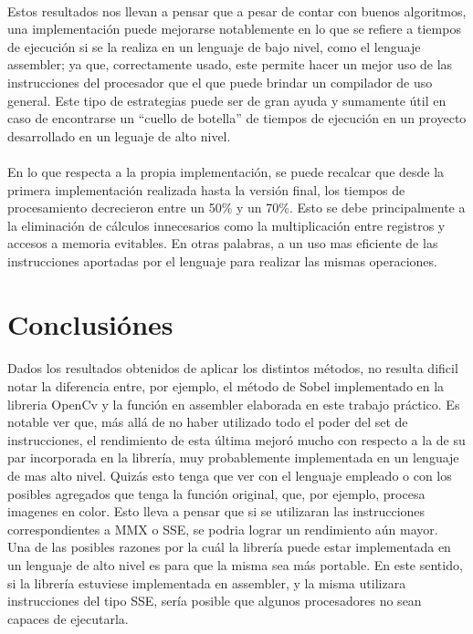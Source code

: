 \documentclass[11pt, a4paper]{article}
\begin{document}
\paragraph{}
Estos resultados nos llevan a pensar que a pesar de contar con buenos algoritmos, una implementaci\'on puede mejorarse notablemente en lo que se refiere a tiempos de ejecuci\'on si se la realiza en un lenguaje de bajo nivel, como el lenguaje assembler; ya que, correctamente usado, este permite hacer un mejor uso de las instrucciones del procesador que el que puede brindar un compilador de uso general. Este tipo de estrategias puede ser de gran ayuda y sumamente \'util en caso de encontrarse un ``cuello de botella'' de tiempos de ejecuci\'on en un proyecto desarrollado en un leguaje de alto nivel.

\paragraph{}
En lo que respecta a la propia implementaci\'on, se puede recalcar que desde la primera implementaci\'on realizada hasta la versi\'on final, los tiempos de procesamiento decrecieron entre un 50\% y un 70\%. Esto se debe principalmente a la eliminaci\'on de c\'alculos innecesarios como la multiplicaci\'on entre registros y accesos a memoria evitables. En otras palabras, a un uso mas eficiente de las instrucciones aportadas por el lenguaje para realizar las mismas operaciones.


\newpage

\section{Conclusi\'ones}

\paragraph{}

Dados los resultados obtenidos de aplicar los distintos m\'etodos, no resulta dificil notar la diferencia entre, por ejemplo, el m\'etodo de Sobel implementado en la libreria OpenCv y la funci\'on en assembler elaborada en este trabajo pr\'actico. Es notable ver que, m\'as all\'a de no haber utilizado todo el poder del set de instrucciones, el rendimiento de esta \'ultima mejor\'o mucho con respecto a la de su par incorporada en la librer\'ia, muy probablemente implementada en un lenguaje de mas alto nivel.
Quiz\'as esto tenga que ver con el lenguaje empleado o con los posibles agregados que tenga la funci\'on original, que, por ejemplo, procesa imagenes en color. Esto lleva a pensar que si se utilizaran las instrucciones correspondientes a MMX o SSE, se podria lograr un rendimiento a\'un mayor.\\
Una de las posibles razones por la cu\'al la librer\'ia puede estar implementada en un lenguaje de alto nivel es para que la misma sea m\'as portable. En este sentido, si la librer\'ia estuviese implementada en assembler, y la misma utilizara instrucciones del tipo SSE, ser\'ia posible que algunos procesadores no sean capaces de ejecutarla.
\end{document}
